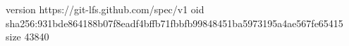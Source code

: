 version https://git-lfs.github.com/spec/v1
oid sha256:931bde864188b07f8eadf4bffb71fbbfb99848451ba5973195a4ae567fe65415
size 43840
